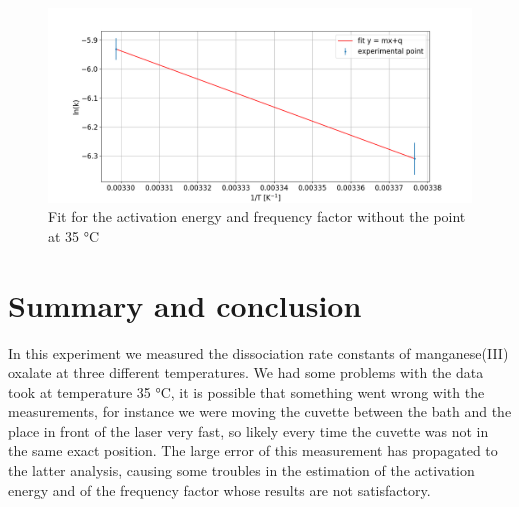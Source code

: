 \documentclass[a4paper,10pt]{article}
\begin{document}
\begin{figure}[H]
\centering
\includegraphics[width=\textwidth]{energy2}
\caption{Fit for the activation energy and frequency factor without the point at 35 °C}\label{energy2}
\end{figure}
\section{Summary and conclusion}
In this experiment we measured the dissociation rate constants of manganese(III) oxalate at three different temperatures. We had some problems with the data took at temperature 35 °C, it is possible that something went wrong with the measurements, for instance we were moving the cuvette between the bath and the place in front of the laser very fast, so likely every time the cuvette was not in the same exact position. The large error of this measurement has propagated to the latter analysis, causing some troubles in the estimation of the activation energy and of the frequency factor whose results are not satisfactory. 
\end{document}
